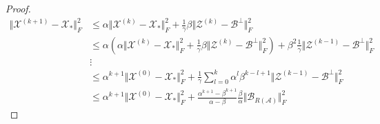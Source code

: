 \documentclass[11pt]{article}
\def\fm#1{\mathcal{#1}}
\def \x#1{\fm X^{(#1)}}
\begin{document}
\begin{proof}
\begin{align*}
    \Vert \x{k+1} - \fm X_\ast \Vert_F^2  & \leq \alpha  \Vert \x k - \fm X_\ast \Vert_F^2 + \frac{1}{\gamma}\beta \Vert \fm Z^{(k)} - \fm B^\perp \Vert_F^2\\
    & \leq \alpha \left( \alpha  \Vert \x k - \fm X_\ast \Vert_F^2 + \frac{1}{\gamma}\beta \Vert \fm Z^{(k)} - \fm B^\perp \Vert_F^2 \right) + \beta^2 \frac{1}{\gamma} \Vert \fm Z^{(k-1)} - \fm B^\perp \Vert_F^2\\
    &\vdots\\
    & \leq \alpha^{k+1} \Vert \x 0 - \fm X_\ast \Vert_F^2  + \frac{1}{\gamma}\sum_{l=0}^k \alpha^{l} \beta^{k-l+1}  \Vert \fm Z^{(k-1)} - \fm B^\perp \Vert_F^2\\
    &\leq \alpha^{k+1} \Vert \x 0 - \fm X_\ast \Vert_F^2 + \frac{\alpha^{k+1} -\beta^{k+1}}{\alpha - \beta} \frac{\beta}{\alpha}\Vert \fm B_{R(\fm A)}\Vert_F^2
\end{align*}
\end{proof}


\end{document}
